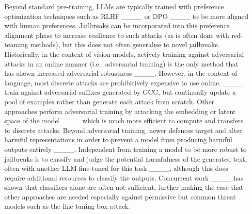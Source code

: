 Beyond standard pre-training, LLMs are typically trained with preference optimization techniques such as RLHF ____ or DPO ____ to be more aligned with human preferences.
Jailbreaks can be incorporated into this preference alignment phase to increase resilience to such attacks (as is often done with red-teaming methods), but this does not often generalise to novel jailbreaks.
Historically, in the context of vision models, actively training against adversarial attacks in an online manner (i.e., adversarial training) is the only method that has shown increased adversarial robustness ____. However, in the context of language, most discrete attacks are prohibitively expensive to use online. 
____ train against adversarial suffixes generated by GCG, but continually update a pool of examples rather than generate each attack from scratch.
Other approaches perform adversarial training by attacking the embedding or latent space of the model____ which is much more efficient to compute and transfers to discrete attacks.
Beyond adversarial training, newer defences target and alter harmful representations in order to prevent a model from producing harmful outputs entirely ____.
Independent from training a model to be more robust to jailbreaks is to classify and judge the potential harmfulness of the generated text, often with another LLM fine-tuned for this task ____, although this does require additional resources to classify the outputs. Concurrent work ____ has shown that classifiers alone are often not sufficient, further making the case that other approaches are needed especially against permissive but common threat models such as the fine-tuning box attack.


